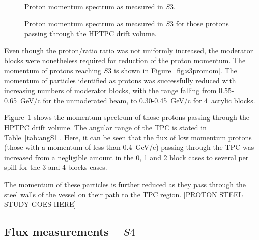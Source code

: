 \begin{figure}[ht]
  \centering
  \begin{minipage}[t]{0.49\textwidth}
    \begin{adjustbox}{max totalsize={\textwidth}, center}
      
    \end{adjustbox}
    \caption{Proton momentum spectrum as measured in $\mathit{S3}$.}
    \label{fig:s3promom}
  \end{minipage}
  \hfill
  \begin{minipage}[t]{0.49\textwidth}
    \begin{adjustbox}{max totalsize={\textwidth}, center}
      
    \end{adjustbox}
    \caption{Proton momentum spectrum as measured in $\mathit{S3}$ for those protons passing through the HPTPC drift volume.}
    \label{fig:tpcpromom}
  \end{minipage}
\end{figure}

Even though the proton/ratio ratio was not uniformly increased, the moderator blocks were nonetheless required for reduction of the proton momentum.
The momentum of protons reaching $\mathit{S3}$ is shown in Figure~\ref{fig:s3promom}. 
The momentum of particles identified as protons was successfully reduced with increasing numbers of moderator blocks, with the range falling from 0.55-0.65~GeV/c for the unmoderated beam, to 0.30-0.45~GeV/c for 4~acrylic blocks.

Figure~\ref{fig:tpcpromom} shows the momentum spectrum of those protons passing through the HPTPC drift volume.
The angular range of the TPC is stated in Table~\ref{tab:angS1}.
Here, it can be seen that the flux of low momentum protons (those with a momentum of less than 0.4~GeV/c) passing through the TPC was increased from a negligible amount in the 0, 1 and 2 block cases to several per spill for the 3 and 4 blocks cases.

The momentum of these particles is further reduced as they pass through the steel walls of the vessel on their path to the TPC region.
[PROTON STEEL STUDY GOES HERE]

\subsection{Flux measurements -- $\mathit{S4}$}

